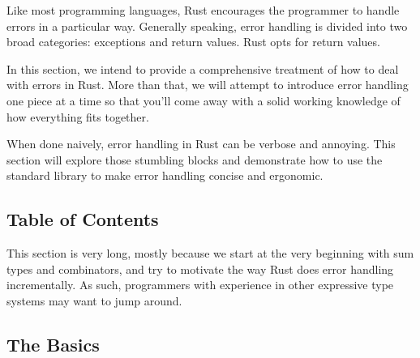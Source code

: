 Like most programming languages, Rust encourages the programmer to handle errors in a particular way. Generally speaking, 
error handling is divided into two broad categories: exceptions and return values. Rust opts for return values.

\blank

In this section, we intend to provide a comprehensive treatment of how to deal with errors in Rust. More than that, we will 
attempt to introduce error handling one piece at a time so that you'll come away with a solid working knowledge of how everything 
fits together.

\blank

When done naively, error handling in Rust can be verbose and annoying. This section will explore those stumbling blocks and 
demonstrate how to use the standard library to make error handling concise and ergonomic.

\subsection*{Table of Contents}

This section is very long, mostly because we start at the very beginning with sum types and combinators, and try to motivate 
the way Rust does error handling incrementally. As such, programmers with experience in other expressive type systems may 
want to jump around.
%
%
\subsection*{The Basics}


